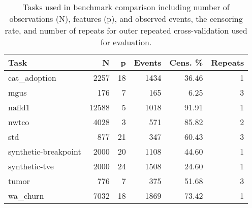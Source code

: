 \begin{table}

\caption{Tasks used in benchmark comparison including number of observations (N), features (p), and observed events, the censoring rate, and number of repeats for outer repeated cross-validation used for evaluation.\label{tab:bm-tasks}}
\centering
\begin{tabular}[t]{lrrrrr}
\toprule
Task & N & p & Events & Cens. \% & Repeats\\
\midrule
cat\_adoption & 2257 & 18 & 1434 & 36.46 & 1\\
mgus & 176 & 7 & 165 & 6.25 & 3\\
nafld1 & 12588 & 5 & 1018 & 91.91 & 1\\
nwtco & 4028 & 3 & 571 & 85.82 & 2\\
std & 877 & 21 & 347 & 60.43 & 3\\
synthetic-breakpoint & 2000 & 20 & 1108 & 44.60 & 1\\
synthetic-tve & 2000 & 24 & 1508 & 24.60 & 1\\
tumor & 776 & 7 & 375 & 51.68 & 3\\
wa\_churn & 7032 & 18 & 1869 & 73.42 & 1\\
\bottomrule
\end{tabular}
\end{table}
